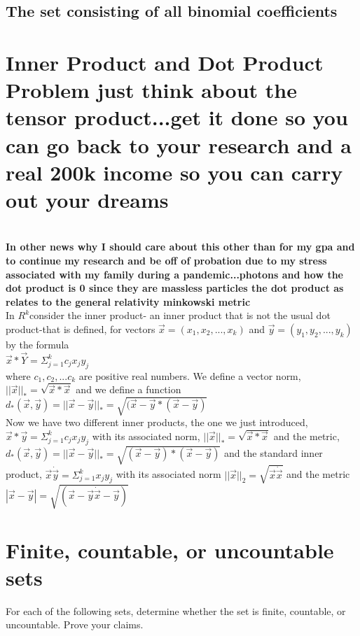\subsection{The set consisting of all binomial coefficients}

\section*{Inner Product and Dot Product Problem just think about the tensor product...get it done so you can go back to your research and a real 200k income so you can carry out your dreams}\\ 
\textbf{In other news why I should care about this other than for my gpa and to continue my research and be off of probation due to my stress associated with my family during a pandemic...photons and how the dot product is 0 since they are massless particles the dot product as relates to the general relativity minkowski metric }\\
In $R^k$consider the inner product- an inner product that is not the usual dot product-that is defined, for vectors $\Vec{x}=(x_1,x_2,...,x_k)$ and $\Vec{y}=(y_1,y_2, ..., y_k)$ by the formula \\ 
$\Vec{x} * \Vec{Y}= \Sigma_{j=1}^{k}c_j x_j y_j$ \\ 
where $c_1, c_2, ... c_k$ are positive real numbers. We define a vector norm, $||\Vec{x}||_{*}=\sqrt{\Vec{x}*\Vec{x}}$ and we define a function $d_*(\Vec{x}, \Vec{y})=||\Vec{x}-\Vec{y}||_*=\sqrt{(\Vec{x}-\Vec{y}*(\Vec{x}-\Vec{y})}$ \\ 
Now we have two different inner products, the one we just introduced, $\Vec{x}*\Vec{y}=\Sigma_{j=1}^k c_{j}x_{j}y_{j}$ with its associated norm, $||\Vec{x}||_*=\sqrt{\Vec{x}*\Vec{x}}$ and the metric, $d_{*}(\Vec{x},\Vec{y})=||\Vec{x}-\Vec{y}||_{*}=\sqrt{(\Vec{x}-\Vec{y})*(\Vec{x}-\Vec{y})}$ and the standard inner product, $\Vec{x}\dot\Vec{y}=\Sigma_{j=1}^{k}x_jy_j$ with its associated norm $||\Vec{x}||_2 = \sqrt{\Vec{x}\dot \Vec{x}}$ and the metric $|\Vec{x}-\Vec{y}|=\sqrt{(\Vec{x}-\Vec{y}\dot \Vec{x}-\Vec{y})}$ \\ 



\section{Finite, countable, or uncountable sets}
For each of the following sets, determine whether the set is finite, countable, or uncountable. Prove your claims. \\ 
